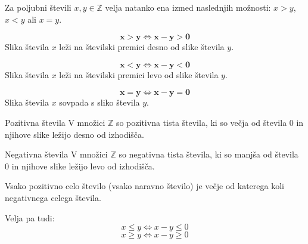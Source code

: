         \begin{frame}
            \begin{block}{}
                Za poljubni števili $x,y\in\mathbb{Z}$ velja natanko ena izmed naslednjih možnosti: $x>y$, $x<y$ ali $x=y$.
            \end{block}

            \begin{block}{}
                $$\mathbf{x>y \Leftrightarrow x-y>0}$$
                Slika števila $x$ leži na številski premici desno od slike števila $y$.
            \end{block}

            \begin{block}{}
                $$\mathbf{x<y \Leftrightarrow x-y<0}$$
                Slika števila $x$ leži na številski premici levo od slike števila $y$.
            \end{block}

            \begin{block}{}
                $$\mathbf{x=y \Leftrightarrow x-y=0}$$
                Slika števila $x$ sovpada s sliko števila $y$.
            \end{block}

        \end{frame}

        \begin{frame}
            \begin{block}{Pozitivna števila}
                V množici $\mathbb{Z}$ so pozitivna tista števila, ki so večja od števila $0$ 
                in njihove slike ležijo desno od izhodišča.
            \end{block}
            
            \begin{block}{Negativna števila}
                V množici $\mathbb{Z}$ so negativna tista števila, ki so manjša od števila $0$ 
                in njihove slike ležijo levo od izhodišča.
            \end{block}

            \begin{block}{}
                Vsako pozitivno celo število (vsako naravno število) je večje od katerega koli negativnega celega števila.
            \end{block}

            \begin{block}{}
                Velja pa tudi:
                $$x\leq y \Leftrightarrow x-y\leq 0 $$
                $$x\geq y \Leftrightarrow x-y\geq 0 $$
            \end{block}
        \end{frame}


